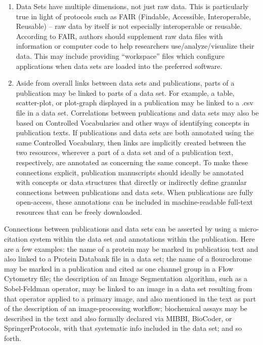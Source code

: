 \documentclass[11pt,letterpaper]{article}
\newcommand{\p}[1]{

\vspace{.7em}#1}
\newcommand{\q}[1]{{\fontfamily{qcr}\selectfont ``}#1{\fontfamily{qcr}\selectfont ''}}
\begin{document}
{{\begin{enumerate}
\item{} Data Sets have multiple dimensions, not just raw data.  This is particularly true in light of protocols such as FAIR (Findable, Accessible, Interoperable, Reusable) -- raw data by itself is not especially interoperable or reusable.  According to FAIR, authors should supplement raw data files with information or computer code to help researchers use/analyze/visualize their data.  This may include providing \q{workspace} files which configure applications when data sets are loaded into the preferred software.

\item{} Aside from overall links between data sets and publications, parts of a publication may be linked to parts of a data set.  For example, a table, scatter-plot, or plot-graph displayed in a publication may be linked to a .csv file in a data set.  Correlations between publications and data sets may also be based on Controlled Vocabularies and other ways of identifying concepts in publication texts.  If publications and data sets are both annotated using the same Controlled Vocabulary, then links are implicitly created between the two resources, wherever a part of a data set and of a publication text, respectively, are annotated as concerning the same concept.  To make these connections explicit, publication manuscripts should ideally be annotated with concepts or data structures that directly or indirectly define granular connections between publications and data sets.  When publications are fully open-access, these annotations can be included in machine-readable full-text resources that can be freely downloaded.
\end{enumerate}
}

\p{Connections between publications and data sets can be asserted by using a micro-citation system within the data set and annotations within the publication.  Here are a few examples: the name of a protein may be marked in publication text and also linked to a Protein Databank file in a data set; the name of a flourochrome may be marked in a publication and cited as one channel group in a Flow Cytometry file; the description of an Image Segmentation algorithm, such as a Sobel-Feldman operator, may be linked to an image in a data set resulting from that operator applied to a primary image, and also mentioned in the text as part of the description of an image-processing workflow; biochemical assays may be described in the text and also formally declared via MIBBI, BioCoder, or SpringerProtocols, with that systematic info included in the data set; and so forth.}

}
\end{document}
